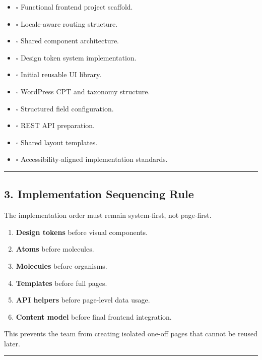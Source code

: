 \documentclass[12pt,a4paper]{article}
\providecommand{\tightlist}{\setlength{\itemsep}{0pt}\setlength{\parskip}{0pt}}
\begin{document}
\begin{itemize}
\tightlist
\item
  \(\square\) Functional frontend project scaffold.
\item
  \(\square\) Locale-aware routing structure.
\item
  \(\square\) Shared component architecture.
\item
  \(\square\) Design token system implementation.
\item
  \(\square\) Initial reusable UI library.
\item
  \(\square\) WordPress CPT and taxonomy structure.
\item
  \(\square\) Structured field configuration.
\item
  \(\square\) REST API preparation.
\item
  \(\square\) Shared layout templates.
\item
  \(\square\) Accessibility-aligned implementation standards.
\end{itemize}

\begin{center}\rule{0.5\linewidth}{0.5pt}\end{center}

\subsection{3. Implementation Sequencing Rule}\label{implementation-sequencing-rule}

The implementation order must remain system-first, not page-first.

\begin{enumerate}
\def\labelenumi{\arabic{enumi}.}
\tightlist
\item
  \textbf{Design tokens} before visual components.
\item
  \textbf{Atoms} before molecules.
\item
  \textbf{Molecules} before organisms.
\item
  \textbf{Templates} before full pages.
\item
  \textbf{API helpers} before page-level data usage.
\item
  \textbf{Content model} before final frontend integration.
\end{enumerate}

This prevents the team from creating isolated one-off pages that cannot be reused later.

\begin{center}\rule{0.5\linewidth}{0.5pt}\end{center}
\end{document}
